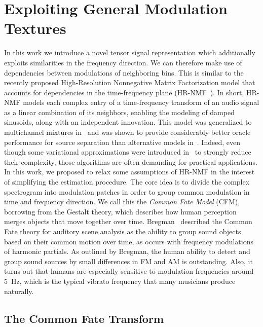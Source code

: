 \section{Exploiting General Modulation Textures}


In this work we introduce a novel tensor signal representation which additionally exploits similarities in the frequency direction.
We can therefore make use of dependencies between modulations of neighboring bins.
This is similar to the recently proposed High-Resolution Nonnegative Matrix Factorization model that accounts for dependencies in the time-frequency plane (HR-NMF~\cite{badeau11}).
In short, HR-NMF models each complex entry of a time-frequency transform of an audio signal as a linear combination of its neighbors, enabling the modeling of damped sinusoids, along with an independent innovation.
This model was generalized to multichannel mixtures in~\cite{badeau13a,badeau14} and was shown to provide considerably better oracle performance for source separation than alternative models in~\cite{magron15a}.
Indeed, even though some variational approximations were introduced in~\cite{badeau13} to strongly reduce their complexity, those algorithms are often demanding for practical applications.
In this work, we proposed to relax some assumptions of HR-NMF in the interest of simplifying the estimation procedure.
The core idea is to divide the complex spectrogram into modulation patches in order to group common modulation in time and frequency direction.
We call this the \emph{Common Fate Model} (CFM), borrowing from the Gestalt theory, which describes how human perception merges objects that move together over time.
Bregman~\cite{bregman94} described the Common Fate theory for auditory scene analysis as the ability to group sound objects based on their common motion over time, as occurs with frequency modulations of harmonic partials.
As outlined by Bregman, the human ability to detect and group sound sources by small differences in FM and AM is outstanding.
Also, it turns out that humans are especially sensitive to modulation frequencies around 5~Hz, which is the typical vibrato frequency that many musicians produce naturally.

\subsection{The Common Fate Transform}
\label{sub:CFT}

